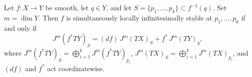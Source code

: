 %

\begin{proposition}
Let $f: X \to Y$ be smooth, let $q \in Y$, and let $S = \{p_1,\ldots,p_k\} \subset f^{-1}(q)$.
Set $m = \dim Y$.
Then $f$ is simultaneously locally infinitesimally stable at $p_1,\ldots,p_k$ if and only if
\[
J^m(f^*TY)_S = (df)\, J^m(TX)_S + f^*\, J^m(TY)_q,
\]
where $J^m(f^*TY)_S = \bigoplus_{i=1}^{k} J^m(f^*TY)_{p_i}$,
$J^m(TX)_S = \bigoplus_{i=1}^{k} J^m(TX)_{p_i}$,
and $(df)$ and $f^*$ act coordinatewise.
\end{proposition}
